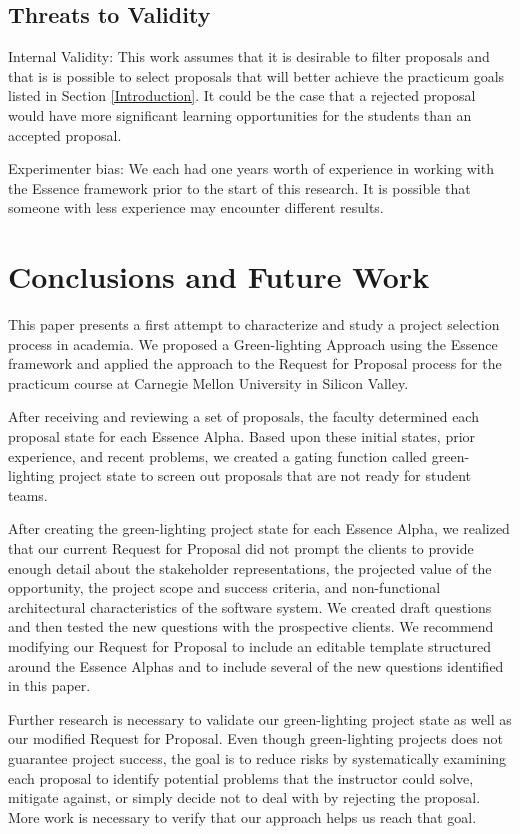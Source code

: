 \documentclass[conference]{IEEEtran}
\begin{document}
\subsection{Threats to Validity}
Internal Validity: This work assumes that it is desirable to filter
proposals and that is is possible to select proposals that will better achieve the
practicum goals listed in Section \ref{Introduction}. It could be the case
that a rejected proposal would have more significant learning
opportunities for the students than an accepted proposal.

Experimenter bias: We each had one years worth of experience in working with
the Essence framework prior to the start of this research. It is
possible that someone with less experience may encounter different results.

\section{Conclusions and Future Work}
\label{Conclusion}

This paper presents a first attempt to characterize and study a project 
selection process in academia. We proposed a Green-lighting Approach using the Essence framework and
applied the approach to the Request for Proposal process for the
practicum course at Carnegie Mellon University in Silicon Valley. 

After receiving and reviewing a set of proposals, the faculty determined each 
proposal state for each Essence Alpha. Based upon these initial states, prior experience, 
and recent problems, we created a gating function called green-lighting project
state to screen out proposals that are not ready for student teams.

After creating the green-lighting project state for each
Essence Alpha, we realized that our current Request for Proposal did
not prompt the clients to provide enough detail about the stakeholder
representations, the projected value of the opportunity, the project
scope and success criteria, and non-functional architectural
characteristics of the software system. We created draft 
questions and then tested the new questions with the prospective
clients. We recommend modifying our Request for Proposal to include
an editable template structured around the Essence Alphas and to include
several of the new questions identified in this paper. 

Further research is necessary to validate our green-lighting project state 
as well as our modified Request for Proposal. 
Even though green-lighting projects does not guarantee project success, 
the goal is to reduce risks by systematically examining each proposal to identify
potential problems that the instructor could solve, mitigate against, 
or simply decide not to deal with by rejecting the proposal.
More work is necessary to verify that our approach helps us reach that goal.
\end{document}
